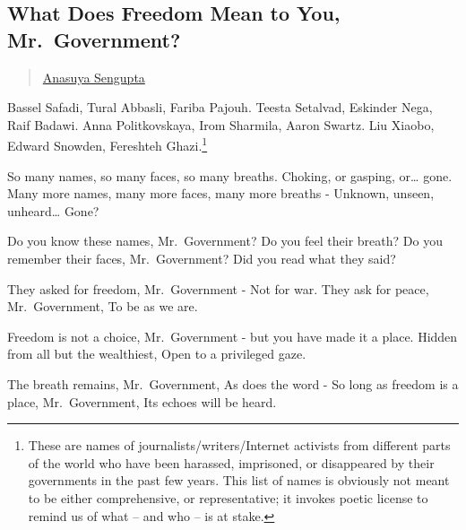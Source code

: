 \subsection{What Does Freedom Mean to You,
Mr.~Government?}\label{what-does-freedom-mean-to-you-mr.government}

\begin{quote}
\href{../appendix/attributions.html\#anasuya-sengupta}{Anasuya Sengupta}
\end{quote}

Bassel Safadi, Tural Abbasli, Fariba Pajouh. Teesta Setalvad, Eskinder
Nega, Raif Badawi. Anna Politkovskaya, Irom Sharmila, Aaron Swartz. Liu
Xiaobo, Edward Snowden, Fereshteh Ghazi.\footnote{These are names of
  journalists/writers/Internet activists from different parts of the
  world who have been harassed, imprisoned, or disappeared by their
  governments in the past few years. This list of names is obviously not
  meant to be either comprehensive, or representative; it invokes poetic
  license to remind us of what -- and who -- is at stake.}

So many names, so many faces, so many breaths. Choking, or gasping,
or\ldots{} gone. Many more names, many more faces, many more breaths -
Unknown, unseen, unheard\ldots{} Gone?

Do you know these names, Mr.~Government? Do you feel their breath? Do
you remember their faces, Mr.~Government? Did you read what they said?

They asked for freedom, Mr.~Government - Not for war. They ask for
peace, Mr.~Government, To be as we are.

Freedom is not a choice, Mr.~Government - but you have made it a place.
Hidden from all but the wealthiest, Open to a privileged gaze.

The breath remains, Mr.~Government, As does the word - So long as
freedom is a place, Mr.~Government, Its echoes will be heard.
